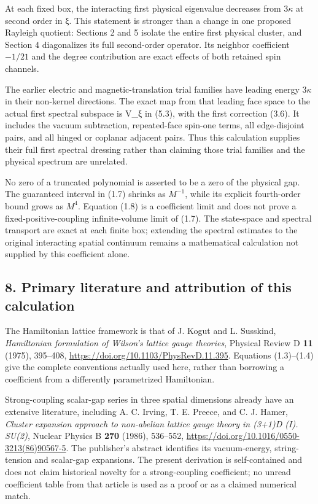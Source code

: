 \documentclass[
  11pt,
]{article}
\begin{document}
At each fixed box, the interacting first physical eigenvalue decreases
from \(3\kappa\) at second order in ξ. This statement is stronger than a
change in one proposed Rayleigh quotient: Sections 2 and 5 isolate the
entire first physical cluster, and Section 4 diagonalizes its full
second-order operator. Its neighbor coefficient \(-1/21\) and the degree
contribution are exact effects of both retained spin channels.

The earlier electric and magnetic-translation trial families have
leading energy \(3\kappa\) in their non-kernel directions. The exact map
from that leading face space to the actual first spectral subspace is
V\_ξ in (5.3), with the first correction (3.6). It includes the vacuum
subtraction, repeated-face spin-one terms, all edge-disjoint pairs, and
all hinged or coplanar adjacent pairs. Thus this calculation supplies
their full first spectral dressing rather than claiming those trial
families and the physical spectrum are unrelated.

No zero of a truncated polynomial is asserted to be a zero of the
physical gap. The guaranteed interval in (1.7) shrinks as \(M^{-1}\),
while its explicit fourth-order bound grows as \(M^4\). Equation (1.8)
is a coefficient limit and does not prove a fixed-positive-coupling
infinite-volume limit of (1.7). The state-space and spectral transport
are exact at each finite box; extending the spectral estimates to the
original interacting spatial continuum remains a mathematical
calculation not supplied by this coefficient alone.

\subsection{8. Primary literature and attribution of this
calculation}\label{magnetic-part-5-primary-literature-and-attribution-of-this-calculation}

The Hamiltonian lattice framework is that of J. Kogut and L. Susskind,
\emph{Hamiltonian formulation of Wilson's lattice gauge theories},
Physical Review D \textbf{11} (1975), 395--408,
\url{https://doi.org/10.1103/PhysRevD.11.395}. Equations (1.3)--(1.4)
give the complete conventions actually used here, rather than borrowing
a coefficient from a differently parametrized Hamiltonian.

Strong-coupling scalar-gap series in three spatial dimensions already
have an extensive literature, including A. C. Irving, T. E. Preece, and
C. J. Hamer, \emph{Cluster expansion approach to non-abelian lattice
gauge theory in (3+1)D (I). SU(2)}, Nuclear Physics B \textbf{270}
(1986), 536--552, \url{https://doi.org/10.1016/0550-3213(86)90567-5}.
The publisher's abstract identifies its vacuum-energy, string-tension
and scalar-gap expansions. The present derivation is self-contained and
does not claim historical novelty for a strong-coupling coefficient; no
unread coefficient table from that article is used as a proof or as a
claimed numerical match.
\end{document}
